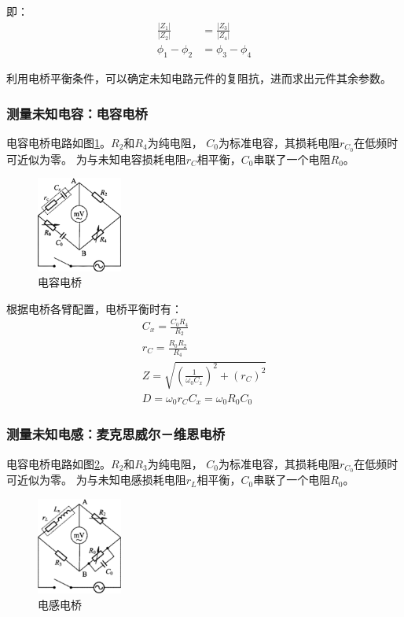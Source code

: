\documentclass[10pt,a4paper,twocolumn,twoside,UTF8]{ctexart}
\begin{document}
	即：
		\begin{align}
			\frac{|Z_1|}{|Z_2|} &= \frac{|Z_3|}{|Z_4|} \\
			\phi_1-\phi_2 &= \phi_3-\phi_4
		\end{align}
	
	利用电桥平衡条件，可以确定未知电路元件的复阻抗，进而求出元件其余参数。

		\subsubsection{测量未知电容：电容电桥}
		电容电桥电路如图\ref{fig:illus-2}。$R_2$和$R_4$为纯电阻，
		$C_0$为标准电容，其损耗电阻$r_{C_0}$在低频时可近似为零。
		为与未知电容损耗电阻$r_C$相平衡，$C_0$串联了一个电阻$R_0$。
		\begin{figure}[htbp]
			\centering
			\includegraphics[width=0.25\textwidth]{attachments/illus-2.png}
			\caption{电容电桥}
			\label{fig:illus-2}
		\end{figure}

		根据电桥各臂配置，电桥平衡时有：
			\begin{gather}
				C_x = \frac{C_0R_4}{R_2} \label{eq:1.1} \\
				r_C = \frac{R_0R_2}{R_4} \label{eq:1.2} \\
				Z = \sqrt{(\frac{1}{\omega_0 C_x})^2+(r_C)^2} \label{eq:1.3} \\
				D = \omega_0r_CC_x = \omega_0R_0C_0 \label{eq:1.4}
			\end{gather}

		\subsubsection{测量未知电感：麦克思威尔－维恩电桥}
		电容电桥电路如图\ref{fig:illus-3}。$R_2$和$R_3$为纯电阻，
		$C_0$为标准电容，其损耗电阻$r_{C_0}$在低频时可近似为零。
		为与未知电感损耗电阻$r_L$相平衡，$C_0$串联了一个电阻$R_0$。
		\begin{figure}[htbp]
			\centering
			\includegraphics[width=0.25\textwidth]{attachments/illus-3.png}
			\caption{电感电桥}
			\label{fig:illus-3}
		\end{figure}
\end{document}
